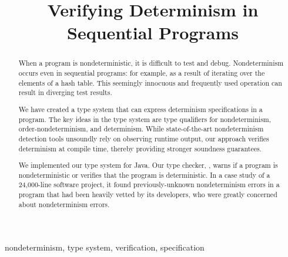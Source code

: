\documentclass[conference,keeplastbox]{IEEEtran}
\begin{document}
\title{Verifying Determinism in Sequential Programs}

\author{
}

\maketitle

\begin{abstract}
When a program is nondeterministic, it is difficult to test and debug.
Nondeterminism occurs even in sequential programs: for example, as a
result of iterating over the elements of a hash table. This seemingly innocuous and
frequently used operation can result in diverging test results.

We have created a type system that can express determinism specifications
in a program.
The key ideas in the type system are type qualifiers for nondeterminism,
order-nondeterminism, and determinism. While state-of-the-art
nondeterminism detection tools unsoundly rely on observing runtime output, our approach
verifies determinism at compile time, thereby providing stronger soundness guarantees.

We implemented our type system for Java.
Our type checker, \theDeterminismChecker, warns if a
program is nondeterministic or verifies that the program is deterministic.
In a case study of a 24,000-line software project, it found
previously-unknown nondeterminism errors in a program that had been heavily
vetted by its developers,
who were greatly concerned about nondeterminism errors.
\end{abstract}

\begin{IEEEkeywords}
nondeterminism, type system, verification, specification
\end{IEEEkeywords}








\end{document}

